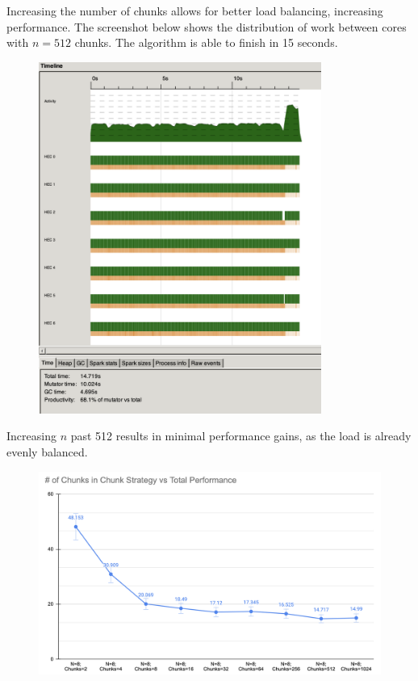 \documentclass{article}
\begin{document}
Increasing the number of chunks allows for better load balancing, increasing performance. The screenshot below shows the distribution of work between cores with $n=512$ chunks. The algorithm is able to finish in 15 seconds.
\begin{figure}[H]
	\centering
	\includegraphics[width=25em]{../images/512_sc.png}
\end{figure}

Increasing $n$ past 512 results in minimal performance gains, as the load is already evenly balanced.
\begin{figure}[H]
	\centering
	\includegraphics[width=40em]{../images/line_sc.png}
\end{figure}
\end{document}
